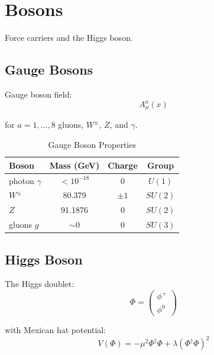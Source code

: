 \section{Bosons}

Force carriers and the Higgs boson.

\subsection{Gauge Bosons}

\begin{definition}
\label{fa_20:def:gauge-boson}
Gauge boson field:
\begin{equation}
A_\mu^a(x)
\end{equation}

for $a = 1,\ldots,8$ gluons, $W^\pm$, $Z$, and $\gamma$.
\end{definition}

\begin{table}[h]
\centering
\caption{Gauge Boson Properties}
\begin{tabular}{lccc}
\toprule
Boson & Mass (GeV) & Charge & Group \\
\midrule
photon $\gamma$ & $<10^{-18}$ & 0 & $U(1)$ \\
$W^\pm$ & 80.379 & $\pm1$ & $SU(2)$ \\
$Z$ & 91.1876 & 0 & $SU(2)$ \\
gluons $g$ & $\sim 0$ & 0 & $SU(3)$ \\
\bottomrule
\end{tabular}
\end{table}

\subsection{Higgs Boson}

\begin{definition}
\label{fa_20:def:higgs}
The Higgs doublet:
\begin{equation}
\Phi = \begin{pmatrix}\phi^+ \\ \phi^0\end{pmatrix}
\end{equation}

with Mexican hat potential:
\begin{equation}
V(\Phi) = -\mu^2\Phi^\dagger\Phi + \lambda(\Phi^\dagger\Phi)^2
\end{equation}
\end{definition}

